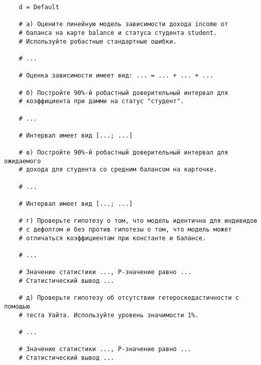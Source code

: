 \documentclass[12pt]{article}
\begin{document}
\begin{enumerate}
\begin{verbatim}
    d = Default

    # а) Оцените линейную модель зависимости дохода income от
    # баланса на карте balance и статуса студента student. 
    # Используйте робастные стандартные ошибки. 

    # ...

    # Оценка зависимости имеет вид: ... = ... + ... + ...

    # б) Постройте 90%-й робастный доверительный интервал для 
    # коэффициента при дамми на статус "студент". 

    # ...

    # Интервал имеет вид [...; ...]

    # в) Постройте 90%-й робастный доверительный интервал для ожидаемого 
    # дохода для студента со средним балансом на карточке. 

    # ... 

    # Интервал имеет вид [...; ...]

    # г) Проверьте гипотезу о том, что модель идентична для индивидов 
    # с дефолтом и без против гипотезы о том, что модель может 
    # отличаться коэффициентам при константе и балансе. 

    # ...

    # Значение статистики ..., P-значение равно ...
    # Статистический вывод ...

    # д) Проверьте гипотезу об отсутствии гетероскедастичности с помощью 
    # теста Уайта. Используйте уровень значимости 1%.
    
    # ...

    # Значение статистики ..., P-значение равно ...
    # Статистический вывод ...
\end{verbatim}



\end{enumerate}
\end{document}
